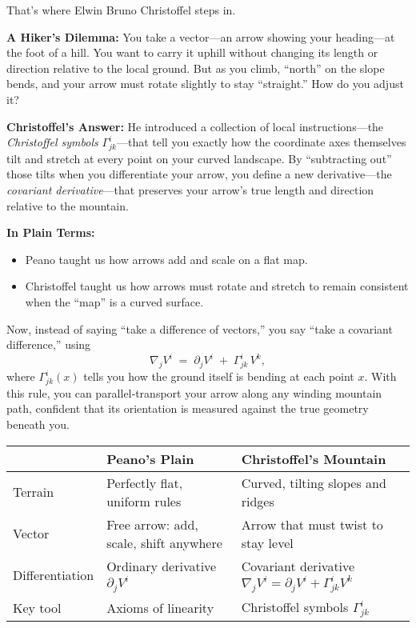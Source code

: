 That’s where Elwin Bruno Christoffel steps in.

\medskip
\noindent\textbf{A Hiker’s Dilemma:}  
You take a vector—an arrow showing your heading—at the foot of a hill.  You want to carry it uphill without changing its length or direction relative to the local ground.  But as you climb, “north” on the slope bends, and your arrow must rotate slightly to stay “straight.”  How do you adjust it?

\medskip
\noindent\textbf{Christoffel’s Answer:}  
He introduced a collection of local instructions—the \emph{Christoffel symbols} \(\Gamma^i_{jk}\)—that tell you exactly how the coordinate axes themselves tilt and stretch at every point on your curved landscape.  By “subtracting out” those tilts when you differentiate your arrow, you define a new derivative—the \emph{covariant derivative}—that preserves your arrow’s true length and direction relative to the mountain.

\medskip
\noindent\textbf{In Plain Terms:}
\begin{itemize}
  \item Peano taught us how arrows add and scale on a flat map.  
  \item Christoffel taught us how arrows must rotate and stretch to remain consistent when the “map” is a curved surface.
\end{itemize}

\noindent Now, instead of saying “take a difference of vectors,” you say “take a covariant difference,” using
\[
\nabla_j V^i \;=\; \partial_j V^i \;+\;\Gamma^i_{jk}\,V^k,
\]
where \(\Gamma^i_{jk}(x)\) tells you how the ground itself is bending at each point \(x\).  With this rule, you can parallel‐transport your arrow along any winding mountain path, confident that its orientation is measured against the true geometry beneath you.

\begin{tcolorbox}[colback=gray!5!white, colframe=black, title=\textbf{Sidebar: Peano’s Plain vs.\ Christoffel’s Mountain}, fonttitle=\bfseries, arc=1.5mm, boxrule=0.4pt]
\begin{tabular}{p{4cm} p{5cm} p{5cm}}
 & \textbf{Peano’s Plain} & \textbf{Christoffel’s Mountain} \\
\midrule
Terrain & Perfectly flat, uniform rules & Curved, tilting slopes and ridges \\
Vector & Free arrow: add, scale, shift anywhere & Arrow that must twist to stay level \\
Differentiation & Ordinary derivative \(\partial_j V^i\) & Covariant derivative \(\nabla_j V^i = \partial_jV^i + \Gamma^i_{jk}V^k\) \\
Key tool & Axioms of linearity & Christoffel symbols \(\Gamma^i_{jk}\)
\end{tabular}
\end{tcolorbox}









